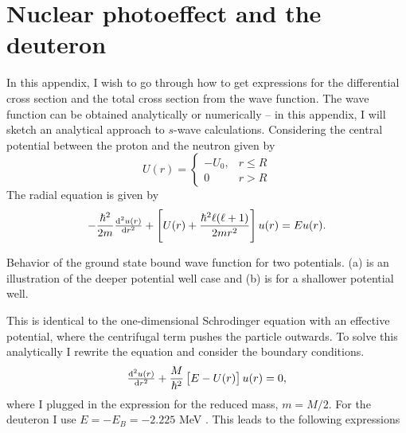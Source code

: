 \appendix

\chapter{Nuclear photoeffect and the deuteron}
In this appendix, I wish to go through how to get expressions for the differential cross section and the total cross section from the wave function. The wave function can be obtained analytically or numerically -- in this appendix, I will sketch an analytical approach to $s$-wave calculations. 
Considering the central potential between the proton and the neutron given by
  \[ U(r)= \begin{cases}
        -U_0, & r \leq R \\
        0 & r > R
     \end{cases}
  \]
  The radial equation is given by
  \begin{equation}
  	-\frac{\hbar^2}{2m} \od[2]{u(r)}{r}+\left[U(r)+\frac{\hbar^2 \ell(\ell+1)}{2mr^2} \right]u(r)=Eu(r).
  \end{equation}
\begin{marginfigure}
\centering

\caption{Behavior of the ground state bound wave function for two potentials. (a) is an illustration of the deeper potential well case and (b) is for a shallower potential well. }
\end{marginfigure}
  This is identical to the one-dimensional Schrodinger equation with an effective potential, where the centrifugal term pushes the particle outwards. To solve this analytically I rewrite the equation and consider the boundary conditions.
\begin{equation} \label{SEnew}
  \od[2]{u(r)}{r}+\frac{M}{\hbar^2} \left[E-U(r) \right]u(r)=0,
\end{equation}
where I plugged in the expression for the reduced mass, $m=M/2$. For the deuteron I use $E=-E_B = -2.225$ MeV \cite[p. 51]{KerneII}. This leads to the following expressions

